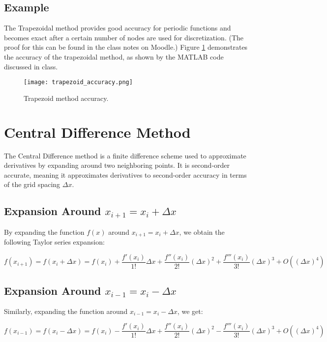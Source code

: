 \documentclass[12pt]{report} %
\begin{document}
\subsection{Example}
The Trapezoidal method provides good accuracy for periodic functions and becomes exact after a certain number of nodes are used for discretization. (The proof for this can be found in the class notes on Moodle.) Figure \ref{fig:trapezoid_accuracy} demonstrates the accuracy of the trapezoidal method, as shown by the MATLAB code discussed in class.

\begin{figure}[h!]
    \centering
    \texttt{[image: trapezoid\_accuracy.png]} %
    \caption{Trapezoid method accuracy.}
    \label{fig:trapezoid_accuracy}
\end{figure}

\section{Central Difference Method}
The Central Difference method is a finite difference scheme used to approximate derivatives by expanding around two neighboring points. It is second-order accurate, meaning it approximates derivatives to second-order accuracy in terms of the grid spacing \(\Delta x\).

\subsection{Expansion Around \(x_{i+1} = x_i + \Delta x\)}
By expanding the function \(f(x)\) around \(x_{i+1} = x_i + \Delta x\), we obtain the following Taylor series expansion:

\begin{equation}
    f(x_{i+1}) = f(x_i + \Delta x) = f(x_i) + \frac{f'(x_i)}{1!} \Delta x + \frac{f''(x_i)}{2!} (\Delta x)^2 + \frac{f'''(x_i)}{3!} (\Delta x)^3 + O((\Delta x)^4)
\end{equation}

\subsection{Expansion Around \(x_{i-1} = x_i - \Delta x\)}
Similarly, expanding the function around \(x_{i-1} = x_i - \Delta x\), we get:

\begin{equation}
    f(x_{i-1}) = f(x_i - \Delta x) = f(x_i) - \frac{f'(x_i)}{1!} \Delta x + \frac{f''(x_i)}{2!} (\Delta x)^2 - \frac{f'''(x_i)}{3!} (\Delta x)^3 + O((\Delta x)^4)
\end{equation}
\end{document}

